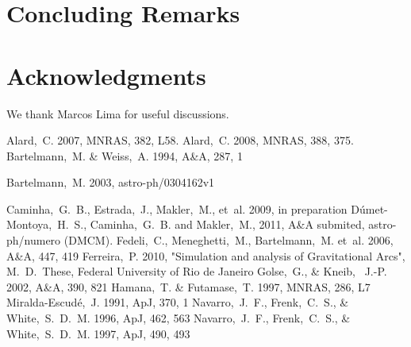 \documentclass[useAMS,usenatbib]{mn2e}
\newcommand{\mnras}{MNRAS}
\newcommand{\apj}{ApJ}
\newcommand{\aap}{A\&A}
\begin{document}
\section{Concluding Remarks}


\section*{Acknowledgments}

We thank Marcos Lima for useful discussions.


\begin{thebibliography}{99}
%
 Alard,~C. 2007, MNRAS, 382, L58.
%
 Alard,~C. 2008, MNRAS, 388, 375.
%
 {Bartelmann},~M. \& {Weiss},~A. 1994, \aap, 287, 1


 {Bartelmann},~M. 2003, astro-ph/0304162v1

 {Caminha},~G.~B., {Estrada},~J., {Makler},~M., {et~al.} 2009, in preparation
%
 D\'umet-Montoya,~H.~S., Caminha,~G.~B. and Makler,~M., 2011, A\&A submited, astro-ph/numero (DMCM).
%
 {Fedeli},~C., {Meneghetti},~M., {Bartelmann},~M. {et~al.} 2006, \aap, 447, 419
%
 {Ferreira},~P. 2010, "Simulation and analysis of Gravitational Arcs", M.~D.~These, Federal University of Rio de Janeiro
%
 Golse,~G., \& Kneib, ~J.-P. 2002, A\&A, 390, 821
%
 {Hamana},~T. \& {Futamase},~T. 1997, \mnras, 286, L7
%
 {Miralda-Escud\'e},~J. 1991, \apj, 370, 1
%
 {Navarro},~J.~F., {Frenk},~C.~S., \& {White},~S.~D.~M. 1996, ApJ, 462, 563
%
 {Navarro},~J.~F., {Frenk},~C.~S., \& {White},~S.~D.~M. 1997, ApJ, 490, 493


\end{thebibliography}
\end{document}

